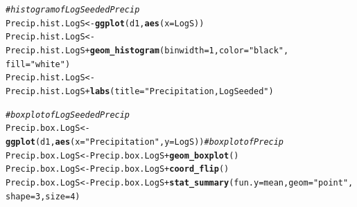 \documentclass{article}\usepackage[]{graphicx}\usepackage[]{color}
\makeatletter
\newcommand{\hlnum}[1]{\textcolor[rgb]{0.686,0.059,0.569}{#1}}%
\newcommand{\hlstr}[1]{\textcolor[rgb]{0.192,0.494,0.8}{#1}}%
\newcommand{\hlcom}[1]{\textcolor[rgb]{0.678,0.584,0.686}{\textit{#1}}}%
\newcommand{\hlopt}[1]{\textcolor[rgb]{0,0,0}{#1}}%
\newcommand{\hlstd}[1]{\textcolor[rgb]{0.345,0.345,0.345}{#1}}%
\newcommand{\hlkwb}[1]{\textcolor[rgb]{0.69,0.353,0.396}{#1}}%
\newcommand{\hlkwc}[1]{\textcolor[rgb]{0.333,0.667,0.333}{#1}}%
\newcommand{\hlkwd}[1]{\textcolor[rgb]{0.737,0.353,0.396}{\textbf{#1}}}%
\newenvironment{kframe}{%
 \def\at@end@of@kframe{}%
 \ifinner\ifhmode%
  \def\at@end@of@kframe{\end{minipage}}%
  \begin{minipage}{\columnwidth}%
 \fi\fi%
 \def\FrameCommand##1{\hskip\@totalleftmargin \hskip-\fboxsep
 \colorbox{shadecolor}{##1}\hskip-\fboxsep
     \hskip-\linewidth \hskip-\@totalleftmargin \hskip\columnwidth}%
 \MakeFramed {\advance\hsize-\width
   \@totalleftmargin\z@ \linewidth\hsize
   \@setminipage}}%
 {\par\unskip\endMakeFramed%
 \at@end@of@kframe}
\newenvironment{knitrout}{}{} %
\makeatother
\begin{document}

\begin{knitrout}
\color{fgcolor}\begin{kframe}
\begin{alltt}
\hlcom{# histogram of Log Seeded Precip}
\hlstd{Precip.hist.LogS} \hlkwb{<-} \hlkwd{ggplot}\hlstd{(d1,} \hlkwd{aes}\hlstd{(}\hlkwc{x} \hlstd{= LogS))}
\hlstd{Precip.hist.LogS} \hlkwb{<-} \hlstd{Precip.hist.LogS} \hlopt{+} \hlkwd{geom_histogram}\hlstd{(}\hlkwc{binwidth} \hlstd{=} \hlnum{1}\hlstd{,}\hlkwc{color} \hlstd{=} \hlstr{"black"}\hlstd{,}
                                            \hlkwc{fill} \hlstd{=} \hlstr{"white"}\hlstd{)}
\hlstd{Precip.hist.LogS} \hlkwb{<-} \hlstd{Precip.hist.LogS} \hlopt{+} \hlkwd{labs}\hlstd{(}\hlkwc{title} \hlstd{=} \hlstr{"Precipitation, Log Seeded"}\hlstd{)}

\hlcom{# boxplot of Log Seeded Precip}
\hlstd{Precip.box.LogS} \hlkwb{<-} \hlkwd{ggplot}\hlstd{(d1,} \hlkwd{aes}\hlstd{(}\hlkwc{x} \hlstd{=} \hlstr{"Precipitation"}\hlstd{,}\hlkwc{y} \hlstd{= LogS))} \hlcom{# boxplot of Precip}
\hlstd{Precip.box.LogS} \hlkwb{<-} \hlstd{Precip.box.LogS} \hlopt{+} \hlkwd{geom_boxplot}\hlstd{()}
\hlstd{Precip.box.LogS} \hlkwb{<-} \hlstd{Precip.box.LogS} \hlopt{+} \hlkwd{coord_flip}\hlstd{()}
\hlstd{Precip.box.LogS} \hlkwb{<-} \hlstd{Precip.box.LogS} \hlopt{+} \hlkwd{stat_summary}\hlstd{(}\hlkwc{fun.y} \hlstd{= mean,} \hlkwc{geom} \hlstd{=} \hlstr{"point"}\hlstd{,}
                                        \hlkwc{shape} \hlstd{=} \hlnum{3}\hlstd{,} \hlkwc{size} \hlstd{=} \hlnum{4}\hlstd{)}
\end{alltt}
\end{kframe}
\end{knitrout}
\end{document}
